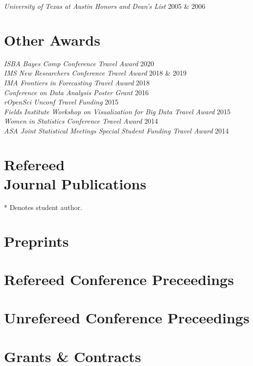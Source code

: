 \documentclass[margin,line]{res}
\begin{document}
\begin{resume}
{\em University of Texas at Austin Honors and Dean's List } \hfill 2005 \& 2006

\section{\sc Other Awards}
{\em ISBA Bayes Comp Conference Travel Award} \hfill 2020 \\
{\em IMS New Researchers Conference Travel Award} \hfill 2018 \& 2019 \\
{\em IMA Frontiers in Forecasting Travel Award} \hfill 2018\\
{\em Conference on Data Analysis Poster Grant } \hfill 2016\\
{\em rOpenSci Unconf Travel Funding } \hfill 2015\\
{\em Fields Institute Workshop on Visualization for Big Data Travel Award } \hfill 2015\\
{\em Women in Statistics Conference Travel Award } \hfill 2014\\
{\em ASA Joint Statistical Meetings Special Student Funding Travel Award } \hfill 2014

\section{\sc Refereed \\ Journal Publications} * Denotes student author.
\printbibliography[keyword=refereed, heading=none, resetnumbers=true]

\section{\sc Preprints}
\printbibliography[keyword=submitted, heading=none, resetnumbers=false]

\printbibliography[keyword=inprep, heading=none]

\section{\sc Refereed Conference Preceedings}
\printbibliography[keyword=conf-ref, heading=none, resetnumbers=false]

\section{\sc Unrefereed Conference Preceedings}
\printbibliography[keyword=conf-unref, heading=none, resetnumbers=false]

\section{\sc Grants \& Contracts}


\end{resume}
\end{document}
